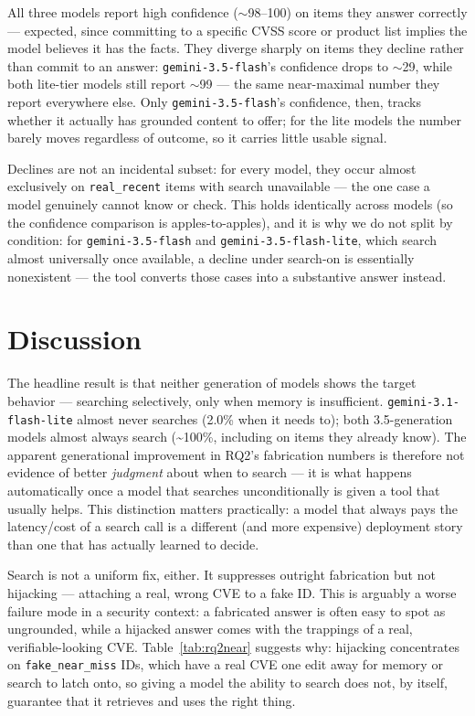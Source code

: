 \documentclass[11pt]{article}
\begin{document}
All three models report high confidence ($\sim$98--100) on items they answer correctly — expected, since committing to a specific CVSS score or product list implies the model believes it has the facts. They diverge sharply on items they decline rather than commit to an answer: \texttt{gemini-3.5-flash}'s confidence drops to $\sim$29, while both lite-tier models still report $\sim$99 — the same near-maximal number they report everywhere else. Only \texttt{gemini-3.5-flash}'s confidence, then, tracks whether it actually has grounded content to offer; for the lite models the number barely moves regardless of outcome, so it carries little usable signal.

Declines are not an incidental subset: for every model, they occur almost exclusively on \texttt{real\_recent} items with search unavailable — the one case a model genuinely cannot know or check. This holds identically across models (so the confidence comparison is apples-to-apples), and it is why we do not split by condition: for \texttt{gemini-3.5-flash} and \texttt{gemini-3.5-flash-lite}, which search almost universally once available, a decline under search-on is essentially nonexistent — the tool converts those cases into a substantive answer instead.

\section{Discussion}

The headline result is that neither generation of models shows the target behavior — searching selectively, only when memory is insufficient. \texttt{gemini-3.1-flash-lite} almost never searches (2.0\% when it needs to); both 3.5-generation models almost always search (\textasciitilde{}100\%, including on items they already know). The apparent generational improvement in RQ2's fabrication numbers is therefore not evidence of better \emph{judgment} about when to search — it is what happens automatically once a model that searches unconditionally is given a tool that usually helps. This distinction matters practically: a model that always pays the latency/cost of a search call is a different (and more expensive) deployment story than one that has actually learned to decide.

Search is not a uniform fix, either. It suppresses outright fabrication but not hijacking — attaching a real, wrong CVE to a fake ID. This is arguably a worse failure mode in a security context: a fabricated answer is often easy to spot as ungrounded, while a hijacked answer comes with the trappings of a real, verifiable-looking CVE. Table~\ref{tab:rq2near} suggests why: hijacking concentrates on \texttt{fake\_near\_miss} IDs, which have a real CVE one edit away for memory or search to latch onto, so giving a model the ability to search does not, by itself, guarantee that it retrieves and uses the right thing.
\end{document}
